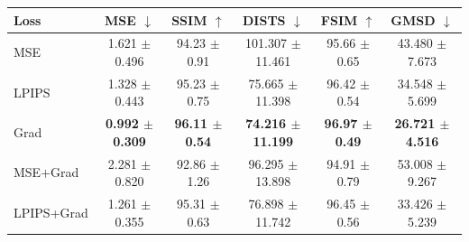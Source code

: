 \begin{tabular}{lccccc}
\hline
Loss & MSE $\downarrow$ & SSIM $\uparrow$ & DISTS $\downarrow$ & FSIM $\uparrow$ & GMSD $\downarrow$ \\
\hline
MSE & 1.621 $\pm$ 0.496 & 94.23 $\pm$ 0.91 & 101.307 $\pm$ 11.461 & 95.66 $\pm$ 0.65 & 43.480 $\pm$ 7.673 \\
LPIPS & 1.328 $\pm$ 0.443 & 95.23 $\pm$ 0.75 & 75.665 $\pm$ 11.398 & 96.42 $\pm$ 0.54 & 34.548 $\pm$ 5.699 \\
Grad & \textbf{0.992 $\pm$ 0.309} & \textbf{96.11 $\pm$ 0.54} & \textbf{74.216 $\pm$ 11.199} & \textbf{96.97 $\pm$ 0.49} & \textbf{26.721 $\pm$ 4.516} \\
MSE+Grad & 2.281 $\pm$ 0.820 & 92.86 $\pm$ 1.26 & 96.295 $\pm$ 13.898 & 94.91 $\pm$ 0.79 & 53.008 $\pm$ 9.267 \\
LPIPS+Grad & 1.261 $\pm$ 0.355 & 95.31 $\pm$ 0.63 & 76.898 $\pm$ 11.742 & 96.45 $\pm$ 0.56 & 33.426 $\pm$ 5.239 \\
\hline
\end{tabular}
